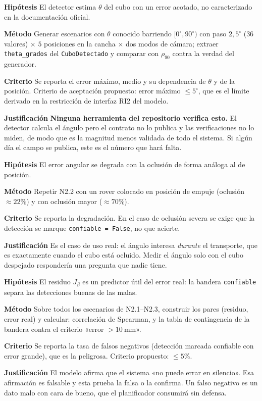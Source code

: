 \documentclass[11pt,a4paper]{article}
\newcommand{\grados}{^{\circ}}
\newenvironment{prueba}[2]{%
  \par\medskip\noindent
  \begin{tcolorbox}[enhanced,breakable,colback=white,colframe=black!45,
    boxrule=0.5pt,arc=1pt,left=6pt,right=6pt,top=4pt,bottom=4pt,
    title={\bfseries #1\quad\normalfont #2},
    colbacktitle=black!8,coltitle=black,fonttitle=\bfseries\small]
  \small
}{\end{tcolorbox}\par\medskip}
\newcommand{\campo}[1]{\par\smallskip\noindent\textbf{#1}\quad\ignorespaces}
\begin{document}
\begin{prueba}{N2.2}{Error de \emph{ángulo} del detector oficial}
\campo{Hipótesis} El detector estima $\theta$ del cubo con un error acotado, no
caracterizado en la documentación oficial.
\campo{Método} Generar escenarios con $\theta$ conocido barriendo
$[0\grados,90\grados)$ con paso $2{,}5\grados$ ($36$ valores) $\times$ $5$ posiciones
en la cancha $\times$ dos modos de cámara; extraer \texttt{theta\_grados} del
\texttt{CuboDetectado} y comparar con $\rho_{90}$ contra la verdad del generador.
\campo{Criterio} Se reporta el error máximo, medio y su dependencia de $\theta$ y de la
posición. Criterio de aceptación propuesto: error máximo $\le 5\grados$, que es el
límite derivado en la restricción de interfaz RI2 del modelo.
\campo{Justificación} \textbf{Ninguna herramienta del repositorio verifica esto.} El
detector calcula el ángulo pero el contrato no lo publica y las verificaciones no lo
miden, de modo que es la magnitud menos validada de todo el sistema. Si algún día el
campo se publica, este es el número que hará falta.
\end{prueba}

\begin{prueba}{N2.3}{Error de ángulo bajo oclusión por empuje}
\campo{Hipótesis} El error angular se degrada con la oclusión de forma análoga al de
posición.
\campo{Método} Repetir N2.2 con un rover colocado en posición de empuje (oclusión
$\approx22\%$) y con oclusión mayor ($\approx70\%$).
\campo{Criterio} Se reporta la degradación. En el caso de oclusión severa se exige que
la detección se marque \texttt{confiable = False}, no que acierte.
\campo{Justificación} Es el caso de uso real: el ángulo interesa \emph{durante} el
transporte, que es exactamente cuando el cubo está ocluido. Medir el ángulo solo con el
cubo despejado respondería una pregunta que nadie tiene.
\end{prueba}

\begin{prueba}{N2.4}{Poder discriminante del criterio de confiabilidad}
\campo{Hipótesis} El residuo $J_\beta$ es un predictor útil del error real: la bandera
\texttt{confiable} separa las detecciones buenas de las malas.
\campo{Método} Sobre todos los escenarios de N2.1--N2.3, construir los pares
(residuo, error real) y calcular: correlación de Spearman, y la tabla de contingencia
de la bandera contra el criterio «error $>10\ \mathrm{mm}$».
\campo{Criterio} Se reporta la tasa de falsos negativos (detección marcada confiable
con error grande), que es la peligrosa. Criterio propuesto: $\le 5\%$.
\campo{Justificación} El modelo afirma que el sistema «no puede errar en silencio».
Esa afirmación es falsable y esta prueba la falsa o la confirma. Un falso negativo es
un dato malo con cara de bueno, que el planificador consumirá sin defensa.
\end{prueba}
\end{document}
